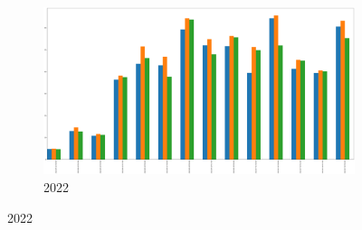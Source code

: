 \begin{figure}[h]
\begin{subfigure}{0.45\textwidth}
		\includegraphics[width=\textwidth]{graphs/2022/FWI_max_before_after.png}
		\caption{2022}
	\end{subfigure}
	\label{fig:daily_fwi_after_before_max}
\end{figure}


